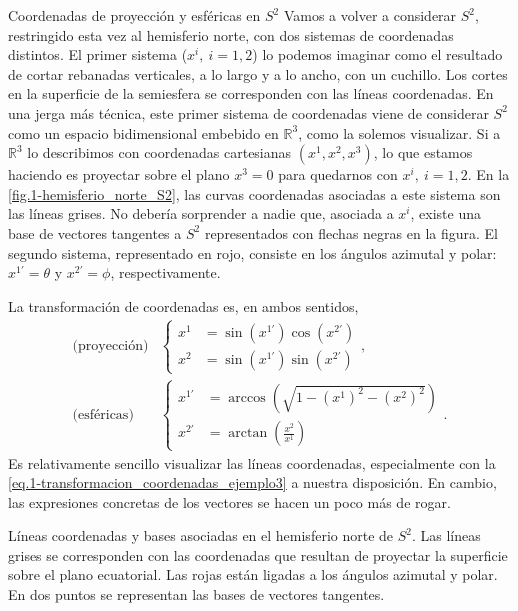 \begin{example}
    {Coordenadas de proyección y esféricas en \(S^2\)}
    \label{ex.1-hemisferio_norte_S2}
    Vamos a volver a considerar \(S^2\), restringido esta vez al hemisferio norte, con dos sistemas de coordenadas distintos. El primer sistema (\(x^i,\ i=1, 2\)) lo podemos imaginar como el resultado de cortar rebanadas verticales, a lo largo y a lo ancho, con un cuchillo. Los cortes en la superficie de la semiesfera se corresponden con las líneas coordenadas. En una jerga más técnica, este primer sistema de coordenadas viene de considerar \(S^2\) como un espacio bidimensional embebido en \(\mathbb{R}^3\), como la solemos visualizar. Si a \(\mathbb{R}^3\) lo describimos con coordenadas cartesianas \(\left(x^1, x^2, x^3\right)\), lo que estamos haciendo es proyectar sobre el plano \(x^3=0\) para quedarnos con \(x^i,\ i=1, 2\). En la \cref{fig.1-hemisferio_norte_S2}, las curvas coordenadas asociadas a este sistema son las líneas grises. No debería sorprender a nadie que, asociada a \(x^i\), existe una base de vectores tangentes a \(S^2\) representados con flechas negras en la figura. El segundo sistema, representado en rojo, consiste en los ángulos azimutal y polar: \(x^{1'}=\theta\) y \(x^{2'}=\phi\), respectivamente. 

    La transformación de coordenadas es, en ambos sentidos,
    \begin{align}
        \nonumber
        \text{(proyección)}&\left\{\begin{aligned}
            x^1 &= \sin\left(x^{1'}\right)\cos\left(x^{2'}\right)\\
            x^2 &= \sin\left(x^{1'}\right)\sin\left(x^{2'}\right)
        \end{aligned}\right., \\
        \label{eq.1-transformacion_coordenadas_ejemplo3}
        \text{(esféricas)}&\left\{\begin{aligned}
            x^{1'} &= \arccos\left(\sqrt{1-\left(x^1\right)^2-\left(x^2\right)^2}\right)\\
            x^{2'} &= \arctan\left(\frac{x^{2}}{x^{1}}\right)
        \end{aligned}\right. .
    \end{align}
    Es relativamente sencillo visualizar las líneas coordenadas, especialmente con la \cref{eq.1-transformacion_coordenadas_ejemplo3} a nuestra disposición. En cambio, las expresiones concretas de los vectores se hacen un poco más de rogar.
    
    \begin{figbox}
        {Líneas coordenadas y bases asociadas en el hemisferio norte de \(S^2\). Las líneas grises se corresponden con las coordenadas que resultan de proyectar la superficie sobre el plano ecuatorial. Las rojas están ligadas a los ángulos azimutal y polar. En dos puntos se representan las bases de vectores tangentes.
        \label{fig.1-hemisferio_norte_S2}}
        
    \end{figbox}


\end{example}
